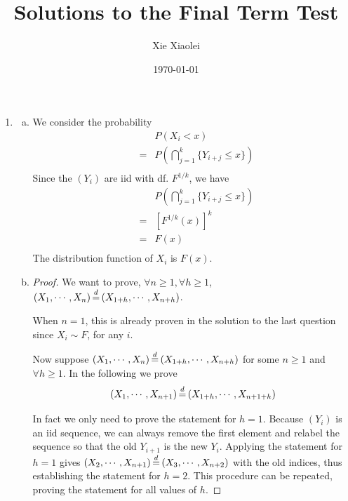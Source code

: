 \documentclass{report}
\author{Xie Xiaolei}
\date{\today}
\title{Solutions to the Final Term Test}
\begin{document}
\maketitle

\begin{enumerate}[1.]
\item
  \begin{enumerate}[(a)]
  \item We consider the probability
    \begin{eqnarray*}
      && P(X_i < x) \\
      &=& P(\bigcap_{j=1}^k \{Y_{i+j} \le x\}) \\
    \end{eqnarray*}
    Since the $(Y_i)$ are iid with df. $F^{1/k}$, we have
    \begin{eqnarray*}
      && P(\bigcap_{j=1}^k \{Y_{i+j} \le x\}) \\
      &=& [F^{1/k}(x)]^k \\
      &=& F(x) \\
    \end{eqnarray*}
    The distribution function of $X_i$ is $F(x)$.

  \item 
    \begin{proof}
      We want to prove, $\forall n \ge 1, \forall h \ge 1$, $(X_1,
      \cdots, X_n) \ed (X_{1+h}, \cdots, X_{n+h})$.

      When $n = 1$, this is already proven in the solution to the last
      question since $X_i \sim F$, for any $i$.

      Now suppose $(X_1, \cdots, X_n) \ed (X_{1+h}, \cdots, X_{n+h})$
      for some $n \ge 1$ and $\forall h \ge 1$. In the following we
      prove 
      \[
      (X_1, \cdots, X_{n+1}) \ed (X_{1+h}, \cdots, X_{n+1+h})
      \]
      
      In fact we only need to prove the statement for $h=1$. Because
      $(Y_i)$ is an iid sequence, we can always remove the first element
      and relabel the sequence so that the old $Y_{i+1}$ is the new
      $Y_{i}$. Applying the statement for $h=1$ gives $(X_2, \cdots,
      X_{n+1}) \ed (X_{3}, \cdots, X_{n+2})$ with the old indices,
      thus establishing the statement for $h=2$. This procedure can be
      repeated, proving the statement for all values of $h$.


\end{proof}
\end{enumerate}
\end{enumerate}
\end{document}
